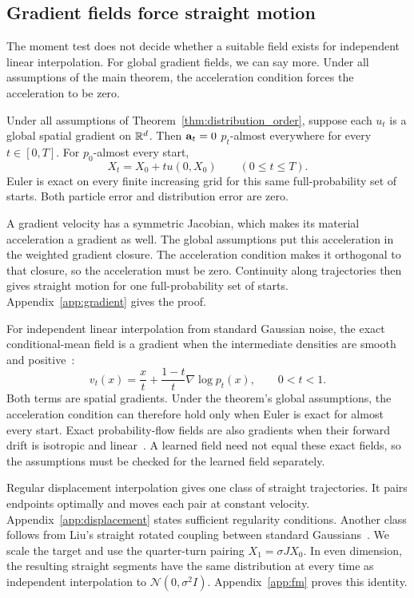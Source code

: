 \subsection{Gradient fields force straight motion}

The moment test does not decide whether a suitable field exists for independent linear interpolation. For global gradient fields, we can say more. Under all assumptions of the main theorem, the acceleration condition forces the acceleration to be zero.
\begin{proposition}
\label{prop:gradient-straight}
Under all assumptions of Theorem~\ref{thm:distribution_order}, suppose each $u_t$ is a global spatial gradient on $\mathbb R^d$. Then $\mathbf a_t=0$ $p_t$-almost everywhere for every $t\in[0,T]$. For $p_0$-almost every start,
\[
 X_t=X_0+t u(0,X_0)\qquad(0\le t\le T).
\]
Euler is exact on every finite increasing grid for this same full-probability set of starts. Both particle error and distribution error are zero.
\end{proposition}
A gradient velocity has a symmetric Jacobian, which makes its material acceleration a gradient as well. The global assumptions put this acceleration in the weighted gradient closure. The acceleration condition makes it orthogonal to that closure, so the acceleration must be zero. Continuity along trajectories then gives straight motion for one full-probability set of starts. Appendix~\ref{app:gradient} gives the proof.

For independent linear interpolation from standard Gaussian noise, the exact conditional-mean field is a gradient when the intermediate densities are smooth and positive~\citep{lipman2023flow}:
\[
 v_t(x)=\frac{x}{t}+\frac{1-t}{t}\nabla\log p_t(x),\qquad 0<t<1.
\]
Both terms are spatial gradients. Under the theorem's global assumptions, the acceleration condition can therefore hold only when Euler is exact for almost every start. Exact probability-flow fields are also gradients when their forward drift is isotropic and linear~\citep{song2021score}. A learned field need not equal these exact fields, so the assumptions must be checked for the learned field separately.

Regular displacement interpolation gives one class of straight trajectories. It pairs endpoints optimally and moves each pair at constant velocity. Appendix~\ref{app:displacement} states sufficient regularity conditions. Another class follows from Liu's straight rotated coupling between standard Gaussians~\citep[Example~3.5]{liu2022marginal}. We scale the target and use the quarter-turn pairing $X_1=\sigma JX_0$. In even dimension, the resulting straight segments have the same distribution at every time as independent interpolation to $\mathcal N(0,\sigma^2I)$. Appendix~\ref{app:fm} proves this identity.

